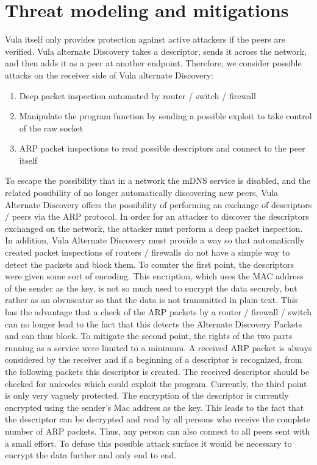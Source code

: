 \documentclass[a4paper,11pt]{report}
\begin{document}
\section{Threat modeling and mitigations}
Vula itself only provides protection against active attackers if the peers are verified. Vula alternate Discovery takes a descriptor, sends it across the network, and then adds it as a peer at another endpoint. 
Therefore, we consider possible attacks on the receiver side of Vula alternate Discovery: 
\begin{enumerate}
    \item Deep packet inspection automated by router / switch / firewall
    \item Manipulate the program function by sending a possible exploit to take control of the raw socket 
    \item ARP packet inspections to read possible descriptors and connect to the peer itself
\end{enumerate}
To escape the possibility that in a network the mDNS service is disabled, and the related possibility of no longer automatically discovering new peers, Vula Alternate Discovery offers the possibility of performing an exchange of descriptors / peers via the ARP protocol. In order for an attacker to discover the descriptors exchanged on the network, the attacker must perform a deep packet inspection. In addition, Vula Alternate Discovery must provide a way so that automatically created packet inspections of routers / firewalls do not have a simple way to detect the packets and block them.
\newline
\newline
To counter the first point, the descriptors were given some sort of encoding. This encription, which uses the MAC address of the sender as the key, is not so much used to encrypt the data securely, but rather as an obvuscator so that the data is not transmitted in plain text. This has the advantage that a check of the ARP packets by a router / firewall / switch can no longer lead to the fact that this detects the Alternate Discovery Packets and can thus block.
\newline
\newline
To mitigate the second point, the rights of the two parts running as a service were limited to a minimum. A received ARP packet is always considered by the receiver and if a beginning of a descriptor is recognized, from the following packets this descriptor is created. The received descriptor should be checked for unicodes which could exploit the program.
\newline
\newline
Currently, the third point is only very vaguely protected. The encryption of the descriptor is currently encrypted using the sender's Mac address as the key. This leads to the fact that the descriptor can be decrypted and read by all persons who receive the complete number of ARP packets. Thus, any person can also connect to all peers sent with a small effort. To defuse this possible attack surface it would be necessary to encrypt the data further and only end to end. 
\end{document}

